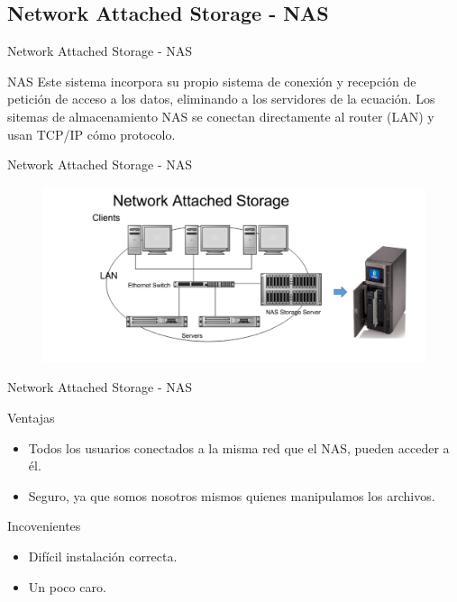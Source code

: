 \documentclass[10pt]{beamer}
\begin{document}
\subsection{Network Attached Storage - NAS}

\begin{frame}{Network Attached Storage - NAS}
\begin{alertblock}{NAS}
Este sistema incorpora su propio sistema de conexión y recepción de petición de acceso a los datos, eliminando a los servidores de la ecuación. Los sitemas de almacenamiento NAS se conectan directamente al router (LAN) y usan TCP/IP cómo protocolo.
\end{alertblock}
\end{frame}

\begin{frame}{Network Attached Storage - NAS}
\begin{figure}[h]
\center
\includegraphics[scale=0.35]{nas.jpg}
\end{figure}
\end{frame}

\begin{frame}{Network Attached Storage - NAS}
\begin{alertblock}{Ventajas}
\begin{itemize}
\item Todos los usuarios conectados a la misma red que el NAS, pueden acceder a él.

\item Seguro, ya que somos nosotros mismos quienes manipulamos los archivos.
\end{itemize}
\begin{alertblock}{Incovenientes}
\begin{itemize}
\item Difícil instalación correcta.
\item Un poco caro.
\end{itemize}
\end{alertblock}

\end{alertblock}

\end{frame}
\end{document}
